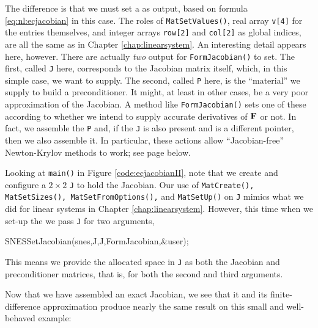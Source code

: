 
The difference is that we must set a \pMat as output, based on formula \eqref{eq:nl:ecjacobian} in this case.  The roles of \texttt{MatSetValues()}, real array \texttt{v[4]} for the entries themselves, and integer arrays \texttt{row[2]} and \texttt{col[2]} as global indices, are all the same as in Chapter \ref{chap:linearsystem}.  An interesting detail appears here, however.  There are actually \emph{two} output \pMats for \texttt{FormJacobian()} to set.  The first, called \texttt{J} here, corresponds to the Jacobian matrix itself, which, in this simple case, we want to supply.  The second, called \texttt{P} here, is the ``material'' we supply to build a preconditioner.  It might, at least in other cases, be a very poor approximation of the Jacobian.  A method like \texttt{FormJacobian()} sets one of these \pMats according to whether we intend to supply accurate derivatives of $\mathbf{F}$ or not.  In fact, we assemble the \pMat \texttt{P} and, if the \pMat \texttt{J} is also present and is a different pointer, then we also assemble it.  In particular, these actions allow ``Jacobian-free'' Newton-Krylov methods to work; see page \pageref{sec:JFNK} below.

Looking at \texttt{main()} in Figure \ref{code:ecjacobianII}, note that we create and configure a $2\times 2$ \pMat \texttt{J} to hold the Jacobian.  Our use of \texttt{MatCreate(), MatSetSizes(), MatSetFromOptions(),} and \texttt{MatSetUp()} on \texttt{J} mimics what we did for linear systems in Chapter \ref{chap:linearsystem}.  However, this time when we set-up the \pSNES we pass \texttt{J} for two arguments,
\begin{code}
SNESSetJacobian(snes,J,J,FormJacobian,&user);
\end{code}
This means we provide the allocated space in \texttt{J} as both the Jacobian and preconditioner matrices, that is, for both the second and third \pMat arguments.

Now that we have assembled an exact Jacobian, we see that it and its finite-difference approximation produce nearly the same result on this small and well-behaved example:


